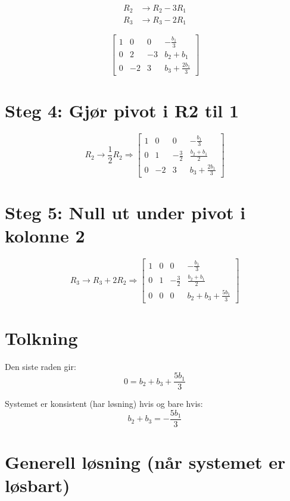 \documentclass[a4paper,12pt]{article}
\begin{document}
\begin{align*}
R_2 &\rightarrow R_2 - 3R_1 \\
R_3 &\rightarrow R_3 - 2R_1
\end{align*}

\[
\left[
\begin{array}{ccc|c}
1 & 0 & 0 & -\frac{b_1}{3} \\
0 & 2 & -3 & b_2 + b_1 \\
0 & -2 & 3 & b_3 + \frac{2b_1}{3}
\end{array}
\right]
\]

\section*{Steg 4: Gjør pivot i R2 til 1}

\[
R_2 \rightarrow \frac{1}{2}R_2
\Rightarrow
\left[
\begin{array}{ccc|c}
1 & 0 & 0 & -\frac{b_1}{3} \\
0 & 1 & -\frac{3}{2} & \frac{b_2 + b_1}{2} \\
0 & -2 & 3 & b_3 + \frac{2b_1}{3}
\end{array}
\right]
\]

\section*{Steg 5: Null ut under pivot i kolonne 2}

\[
R_3 \rightarrow R_3 + 2R_2
\Rightarrow
\left[
\begin{array}{ccc|c}
1 & 0 & 0 & -\frac{b_1}{3} \\
0 & 1 & -\frac{3}{2} & \frac{b_2 + b_1}{2} \\
0 & 0 & 0 & b_2 + b_3 + \frac{5b_1}{3}
\end{array}
\right]
\]

\section*{Tolkning}

Den siste raden gir:
\[
0 = b_2 + b_3 + \frac{5b_1}{3}
\]

Systemet er konsistent (har løsning) hvis og bare hvis:
\[
b_2 + b_3 = -\frac{5b_1}{3}
\]

\section*{Generell løsning (når systemet er løsbart)}
\end{document}
